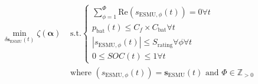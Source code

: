 \begin{equation}
\begin{split}
	\min_{\delta \textbf{s}_\text{ESMU}(t)} \zeta(\boldsymbol{\alpha})
	&\text{ s.t.}
	\begin{cases}
		\sum_{\phi=1}^{\Phi} \text{Re} \left(s_{\text{ESMU},\phi}(t)\right) = 0 \forall t\\
		p_\text{bat}(t) \leq C_f\times C_\text{bat} \forall t\\
		\left|s_{\text{ESMU},\phi}(t)\right| \leq S_\text{rating} \forall \phi \forall t\\
		0 \leq SOC(t) \leq 1 \forall t
	\end{cases}\\
	&\text{ where } (s_{\text{ESMU},\phi}(t)) = \textbf{s}_\text{ESMU}(t) \text{ and } \Phi \in \mathbb{Z}_{>0}
\end{split}
\label{ch1:equ:closed-loop-minimisation}
\end{equation}
